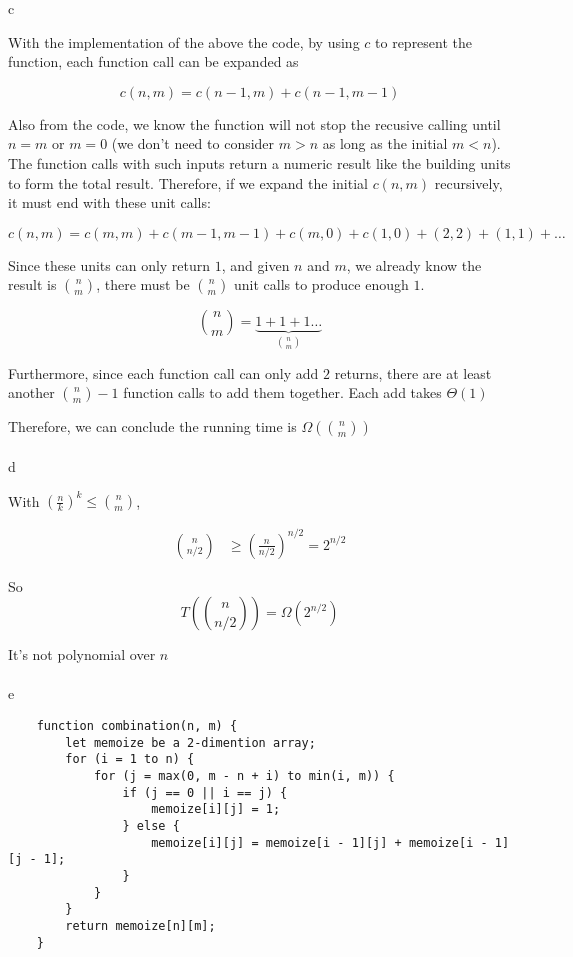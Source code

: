 \documentclass{article}
\begin{document}
c

With the implementation of the above the code, by using $c$ to represent the function, each function call can be expanded as

$$
    c(n, m) = c(n-1, m) + c(n-1, m-1)
$$

Also from the code, we know the function will not stop the recusive calling  until $n = m$ or $m = 0$ (we don't need to consider $m > n$ as long as the initial $m < n$). The function calls with such inputs return a numeric result like the building units to form the total result. Therefore, if we expand the initial $c(n, m)$ recursively, it must end with these unit calls:

$$
    c(n, m) = c(m, m) + c(m-1, m-1) + c(m, 0) + c(1, 0) + (2, 2) + (1, 1) + \dots
$$

Since these units can only return $1$, and given $n$ and $m$, we already know the result is ${n \choose m}$, there must be ${n \choose m}$ unit calls to produce enough $1$.

$$
{n \choose m} = \underbrace{1+1+1\dots}_{n \choose m}
$$

Furthermore, since each function call can only add $2$ returns, there are at least another ${n \choose m}-1$ function calls to add them together. Each add takes $\Theta(1)$

Therefore, we can conclude the running time is $\Omega({n \choose m})$


\paragraph{}

d

With $(\frac{n}{k})^k \le {n \choose m}$,

$$\begin{aligned}
{n \choose n/2} &\ge (\frac{n}{n/2})^{n/2}=2^{n/2}
\end{aligned}$$

So
$$
T({n \choose n/2}) = \Omega(2^{n/2})
$$

It's not polynomial over $n$


\paragraph{}

e

\begin{verbatim}
    function combination(n, m) {
        let memoize be a 2-dimention array;
        for (i = 1 to n) {
            for (j = max(0, m - n + i) to min(i, m)) {
                if (j == 0 || i == j) {
                    memoize[i][j] = 1;
                } else {
                    memoize[i][j] = memoize[i - 1][j] + memoize[i - 1][j - 1];
                }
            }
        }
        return memoize[n][m];
    }
\end{verbatim}
\end{document}
